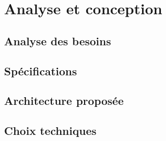 \chapter{Analyse et conception}

\section{Analyse des besoins}

\section{Spécifications}

\section{Architecture proposée}
%

\section{Choix techniques}

